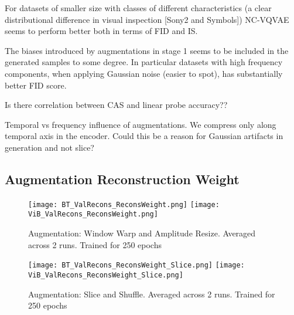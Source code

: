 \documentclass[../../thesis.tex]{subfiles}
\begin{document}
For datasets of smaller size with classes of different characteristics (a clear distributional difference in visual inspection [Sony2 and Symbols]) NC-VQVAE seems to perform better both in terms of FID and IS. \newline

The biases introduced by augmentations in stage 1 seems to be included in the generated samples to some degree. In particular datasets with high frequency components, when applying Gaussian noise (easier to spot), has substantially better FID score.  \newline

Is there correlation between CAS and linear probe accuracy?? \newline

Temporal vs frequency influence of augmentations. We compress only along temporal axis in the encoder. Could this be a reason for Gaussian artifacts in generation and not slice?\newline


\subsection{Augmentation Reconstruction Weight}
\begin{figure}[h]
    \texttt{[image: BT\_ValRecons\_ReconsWeight.png]}
    \texttt{[image: ViB\_ValRecons\_ReconsWeight.png]}
    \caption{Augmentation: Window Warp and Amplitude Resize. Averaged across 2 runs. Trained for 250 epochs}  
    \label{fig:ReconsWeight_warp}
\end{figure}
\begin{figure}[h]
    \texttt{[image: BT\_ValRecons\_ReconsWeight\_Slice.png]}
    \texttt{[image: ViB\_ValRecons\_ReconsWeight\_Slice.png]}
    \caption{Augmentation: Slice and Shuffle. Averaged across 2 runs. Trained for 250 epochs}  
    \label{fig:ReconsWeight_slice}
\end{figure}
\end{document}

